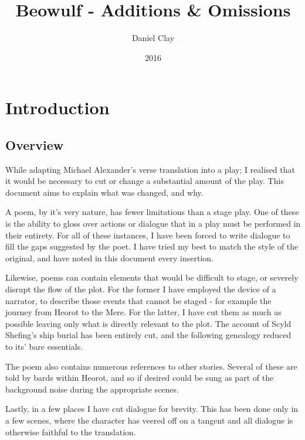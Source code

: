 \documentclass[a4paper]{article}
\begin{document}
\title{Beowulf - Additions \& Omissions}
\date{2016}
\author{
Daniel Clay \\ 
}
\maketitle

\section{Introduction}

\subsection{Overview}%

While adapting Michael Alexander's verse translation into a play; I realised that it would 
be necessary to cut or change a substantial amount of the play. This document
aims to explain what was changed, and why. 

A poem, by it's very nature, has fewer limitations than a stage play. One of these
is the ability to gloss over actions or dialogue that in a play must be performed
in their entirety. For all of these instances, I have been forced to write dialogue
to fill the gaps suggested by the poet. I have tried my best to match the style of 
the original, and have noted in this document every insertion.

Likewise, poems can contain elements that would be difficult to stage, or severely
disrupt the flow of the plot. For the former I have employed the device of a narrator,
to describe those events that cannot be staged - for example the journey from Heorot
to the Mere. For the latter, I have cut them as much as possible leaving only what
is directly relevant to the plot. The account of Scyld Shefing's ship burial has been 
entirely cut, and the following genealogy reduced to its' bare essentials.

The poem also contains numerous references to other stories. Several of these
are told by bards within Heorot, and so if desired could be sung as part of the 
background noise during the appropriate scenes.

Lastly, in a few places I have cut dialogue for brevity. This has been done only
in a few scenes, where the character has veered off on a tangent and all dialogue
is otherwise faithful to the translation.
\end{document}

